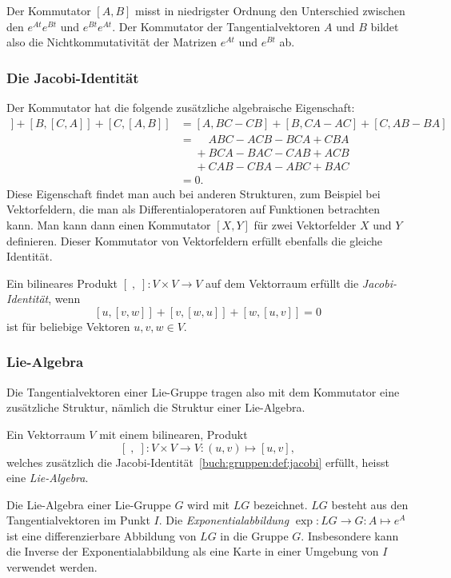 Der Kommutator $[A,B]$ misst in niedrigster Ordnung den Unterschied
zwischen den
$ e^{At} e^{Bt} $
und
$ e^{Bt} e^{At} $.
Der Kommutator der Tangentialvektoren $A$ und $B$ bildet also die
Nichtkommutativität der Matrizen $e^{At}$ und $e^{Bt}$ ab.

\subsubsection{Die Jacobi-Identität}
Der Kommutator hat die folgende zusätzliche algebraische Eigenschaft:
\begin{align*}
[A,[B,C]]
+
[B,[C,A]]
+
[C,[A,B]]
&=
[A,BC-CB]
+
[B,CA-AC]
+
[C,AB-BA]
\\
&=\phantom{+}
ABC-ACB-BCA+CBA
\\
&\phantom{=}+
BCA-BAC-CAB+ACB
\\
&\phantom{=}+
CAB-CBA-ABC+BAC
\\
&=0.
\end{align*}
Diese Eigenschaft findet man auch bei anderen Strukturen, zum Beispiel
bei Vektorfeldern, die man als Differentialoperatoren auf Funktionen 
betrachten kann.
Man kann dann einen Kommutator $[X,Y]$ für zwei Vektorfelder
$X$ und $Y$ definieren.
Dieser Kommutator von Vektorfeldern erfüllt ebenfalls die gleiche
Identität.

\begin{definition}
\label{buch:gruppen:def:jacobi}
Ein bilineares Produkt $[\;,\;]\colon V\times V\to V$ auf dem Vektorraum
erfüllt die {\em Jacobi-Identität}, wenn 
%
\[
[u,[v,w]] + [v,[w,u]] + [w,[u,v]]=0
\]
ist für beliebige Vektoren $u,v,w\in V$.
\end{definition}

\subsubsection{Lie-Algebra}
Die Tangentialvektoren einer Lie-Gruppe tragen also mit dem Kommutator
eine zusätzliche Struktur, nämlich die Struktur einer Lie-Algebra.

\begin{definition}
Ein Vektorraum $V$ mit einem bilinearen, Produkt
\[
[\;,\;]\colon V\times V \to V : (u,v) \mapsto [u,v],
\]
welches zusätzlich die Jacobi-Identität~\ref{buch:gruppen:def:jacobi}
erfüllt, heisst eine {\em Lie-Algebra}.
%
\end{definition}

Die Lie-Algebra einer Lie-Gruppe $G$ wird mit $LG$ bezeichnet.
$LG$ besteht aus den Tangentialvektoren im Punkt $I$.
Die {\em Exponentialabbildung} $\exp\colon LG\to G:A\mapsto e^A$
%
ist eine differenzierbare Abbildung von $LG$ in die Gruppe $G$.
Insbesondere kann die Inverse der Exponentialabbildung als eine
Karte in einer Umgebung von $I$ verwendet werden.

